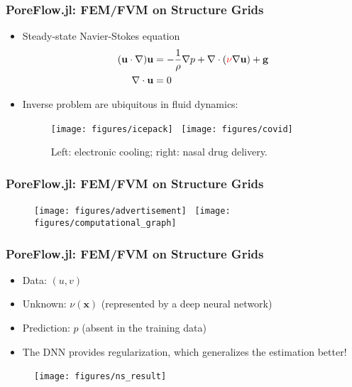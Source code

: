\documentclass[usenames,dvipsnames]{beamer}
\begin{document}
\begin{frame}
	\frametitle{PoreFlow.jl: FEM/FVM on Structure Grids}
	\begin{itemize}
		\item Steady-state Navier-Stokes equation
		\begin{equation*}
	\begin{aligned}
		(\mathbf{u} \cdot \nabla) \mathbf{u} &=
    -\frac{1}{\rho} \nabla p + \nabla\cdot (\textcolor{red}{\nu} \nabla \mathbf{u}) + \mathbf{g}\\
\nabla \cdot \mathbf{u} &= 0
	\end{aligned}
    \end{equation*}
    
    \item Inverse problem are ubiquitous in fluid dynamics:
    
    \begin{figure}[hbt]
    \centering
  \texttt{[image: figures/icepack]}~
  \texttt{[image: figures/covid]}
  \caption{Left: electronic cooling; right: nasal drug delivery.}
\end{figure}

	\end{itemize}
	    
  \end{frame}
  
  
  \begin{frame}
  	\frametitle{PoreFlow.jl: FEM/FVM on Structure Grids}
  	
  	\begin{figure}[hbt]
    \centering
  \texttt{[image: figures/advertisement]}~
  \texttt{[image: figures/computational\_graph]}
\end{figure}
  \end{frame}

  
  
  \begin{frame}
  	\frametitle{PoreFlow.jl: FEM/FVM on Structure Grids}
\begin{itemize}
	\item Data: $(u, v)$
	\item Unknown: $\nu(\mathbf{x})$ (represented by a deep neural network)
	\item Prediction: $p$ (absent in the training data) 
	\item The DNN provides regularization, which generalizes the estimation better!
	\end{itemize}
  	\begin{figure}[hbt]
    \centering
  \texttt{[image: figures/ns\_result]}~
\end{figure}
  \end{frame}
\end{document}
